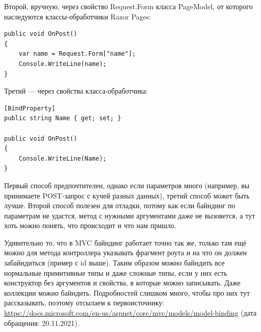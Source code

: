 \documentclass{../../text-style}
\begin{document}
Второй, вручную, через свойство Request.Form класса PageModel, от которого наследуются классы-обработчики Razor Pages:  

\begin{verbatim}
public void OnPost()
{
    var name = Request.Form["name"];
    Console.WriteLine(name);
}
\end{verbatim}

Третий --- через свойства класса-обработчика:

\begin{verbatim}
[BindProperty]
public string Name { get; set; }

public void OnPost()
{
    Console.WriteLine(Name);
}
\end{verbatim}

Первый способ предпочтителен, однако если параметров много (например, вы принимаете POST-запрос с кучей разных данных), третий способ может быть лучше. Второй способ полезен для отладки, потому как если байндинг по параметрам не удастся, метод с нужными аргументами даже не вызовется, а тут хоть можно понять, что происходит и что нам пришло.

Удивительно то, что в MVC байндинг работает точно так же, только там ещё можно для метода контроллера указывать фрагмент роута и на что он должен забайндиться (пример с id выше). Таким образом можно байндить все нормальные примитивные типы и даже сложные типы, если у них есть конструктор без аргументов и свойства, в которые можно записывать. Даже коллекции можно байндить. Подробностей слишком много, чтобы про них тут рассказывать, поэтому отсылаем к первоисточнику: \url{https://docs.microsoft.com/en-us/aspnet/core/mvc/models/model-binding} (дата обращения: 20.11.2021).
\end{document}
